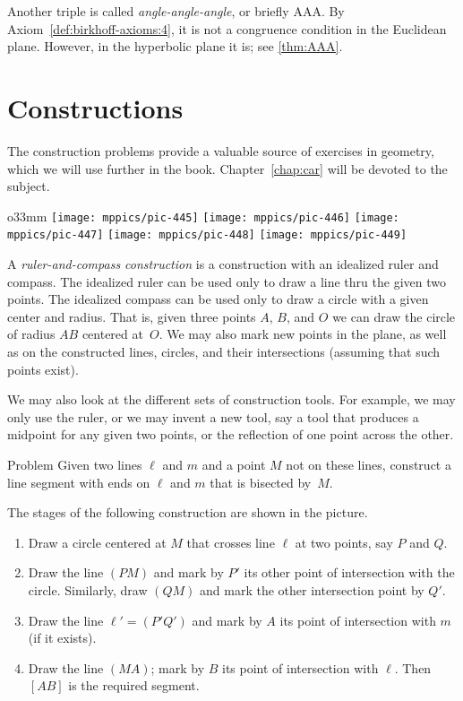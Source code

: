 Another triple is called {}\emph{angle-angle-angle}, or briefly AAA.
By Axiom~\ref{def:birkhoff-axioms:4}, it is not a congruence condition in the Euclidean plane.
However, in the hyperbolic plane it is; see \ref{thm:AAA}.

\section{Constructions}

The construction problems provide a valuable source of exercises in geometry,
which we will use further in the book.
Chapter~\ref{chap:car} will be devoted to the subject.

{

\begin{wrapfigure}{o}{33mm}
\vskip-8mm
\centering
\texttt{[image: mppics/pic-445]}
\bigskip
\texttt{[image: mppics/pic-446]}
\bigskip
\texttt{[image: mppics/pic-447]}
\bigskip
\texttt{[image: mppics/pic-448]}
\bigskip
\texttt{[image: mppics/pic-449]}
\end{wrapfigure}

A \emph{ruler-and-compass construction} is a construction with an idealized ruler and compass.
The idealized ruler can be used only to draw a line thru the given two points.
The idealized compass can be used only to draw a circle with a given center and radius.
That is, given three points $A$, $B$, and $O$
we can draw the circle of radius $AB$ centered at~$O$.
We may also mark new points in the plane,
as well as on the constructed lines, circles,
and their intersections (assuming that such points exist).

We may also look at the different sets of construction tools.
For example,
we may only use the ruler,
or we may invent a new tool,
say a tool that produces a midpoint for any given two points,
or the reflection of one point across the other.

\begin{thm}{Problem}
Given two lines $\ell$ and $m$ and a point $M$ not on these lines,
construct a line segment with ends on $\ell$ and $m$ that is bisected by~$M$.
\end{thm}

The stages of the following construction are shown in the picture.

\begin{enumerate}[1.]
\item Draw a circle centered at $M$ that crosses line $\ell$ at two points, say $P$ and $Q$.
\item Draw the line $(PM)$ and mark by $P'$ its other point of intersection with the circle.
Similarly, draw $(QM)$ and mark the other intersection point by $Q'$.
\item Draw the line $\ell'=(P'Q')$ and mark by $A$ its point of intersection with $m$ (if it exists).
\item Draw the line $(MA)$;
mark by $B$ its point of intersection with $\ell$.
Then $[AB]$ is the required segment.
\end{enumerate}

}

